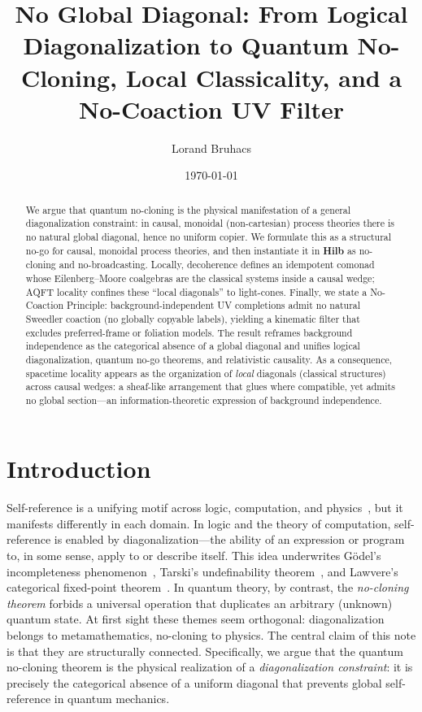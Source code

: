 \documentclass[11pt]{article}
\title{No Global Diagonal: From Logical Diagonalization to Quantum No-Cloning, Local Classicality, and a No-Coaction UV Filter}
\author{Lorand Bruhacs}
\date{\normalsize \today}
\theoremstyle{upright}
\begin{document}
\maketitle

\begin{abstract}
We argue that quantum no-cloning is the physical manifestation of a general diagonalization constraint: in causal, monoidal (non-cartesian) process theories there is no natural global diagonal, hence no uniform copier. We formulate this as a structural no-go for causal, monoidal process theories, and then instantiate it in \textbf{Hilb} as no-cloning and no-broadcasting.
Locally, decoherence defines an idempotent comonad whose Eilenberg--Moore coalgebras are the classical systems inside a causal wedge; AQFT locality confines these ``local diagonals'' to light-cones. Finally, we state a No-Coaction Principle: background-independent UV completions admit no natural Sweedler coaction (no globally copyable labels), yielding a kinematic filter that excludes preferred-frame or foliation models. The result reframes background independence as the categorical absence of a global diagonal and unifies logical diagonalization, quantum no-go theorems, and relativistic causality. As a consequence, spacetime locality appears as the organization of \emph{local} diagonals (classical structures) across causal wedges: a sheaf-like arrangement that glues where compatible, yet admits no global section—an information-theoretic expression of background independence.

\end{abstract}

\tableofcontents

\section{Introduction}
\label{sec:intro}

\paragraph{}
Self-reference is a unifying motif across logic, computation, and physics~\cite{BaezStay2011}, but it manifests differently in each domain. In logic and the theory of computation, self-reference is enabled by diagonalization---the ability of an expression or program to, in some sense, apply to or describe itself. This idea underwrites Gödel's incompleteness phenomenon~\cite{Godel1931}, Tarski's undefinability theorem~\cite{Tarski1936}, and Lawvere's categorical fixed-point theorem~\cite{Lawvere1969}. In quantum theory, by contrast, the \emph{no-cloning theorem} forbids a universal operation that duplicates an arbitrary (unknown) quantum state. At first sight these themes seem orthogonal: diagonalization belongs to metamathematics, no-cloning to physics. The central claim of this note is that they are structurally connected. Specifically, we argue that the quantum no-cloning theorem is the physical realization of a \emph{diagonalization constraint}: it is precisely the categorical absence of a uniform diagonal that prevents global self-reference in quantum mechanics.
\end{document}
